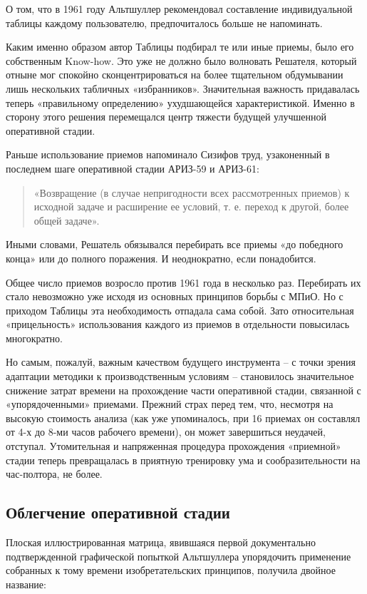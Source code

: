 \documentclass[11pt,a4paper]{article}
\begin{document}
О том, что в 1961 году Альтшуллер рекомендовал составление индивидуальной
таблицы каждому пользователю, предпочиталось больше не напоминать.

Каким именно образом автор Таблицы подбирал те или иные приемы, было его
собственным Know-how. Это уже не должно было волновать Решателя, который
отныне мог спокойно сконцентрироваться на более тщательном обдумывании лишь
нескольких табличных «избранников». Значительная важность придавалась теперь
«правильному определению» ухудшающейся характеристикой. Именно в сторону этого
решения перемещался центр тяжести будущей улучшенной оперативной стадии.

Раньше использование приемов напоминало Сизифов труд, узаконенный в последнем
шаге оперативной стадии АРИЗ-59 и АРИЗ-61:
\begin{quote}
  «Возвращение (в случае непригодности всех рассмотренных приемов) к исходной
  задаче и расширение ее условий, т. е. переход к другой, более общей задаче».
\end{quote}
Иными словами, Решатель обязывался перебирать все приемы «до победного конца»
или до полного поражения. И неоднократно, если понадобится.

Общее число приемов возросло против 1961 года в несколько раз. Перебирать их
стало невозможно уже исходя из основных принципов борьбы с МПиО. Но с приходом
Таблицы эта необходимость отпадала сама собой. Зато относительная
«прицельность» использования каждого из приемов в отдельности повысилась
многократно.

Но самым, пожалуй, важным качеством будущего инструмента -- с точки зрения
адаптации методики к производственным условиям -- становилось значительное
снижение затрат времени на прохождение части оперативной стадии, связанной с
«упорядоченными» приемами. Прежний страх перед тем, что, несмотря на высокую
стоимость анализа (как уже упоминалось, при 16 приемах он составлял от 4-х до
8-ми часов рабочего времени), он может завершиться неудачей, отступал.
Утомительная и напряженная процедура прохождения «приемной» стадии теперь
превращалась в приятную тренировку ума и сообразительности на час-полтора, не
более.

\subsection*{Облегчение оперативной стадии}

Плоская иллюстрированная матрица, явившаяся первой документально
подтвержденной графической попыткой Альтшуллера упорядочить применение
собранных к тому времени изобретательских принципов, получила двойное
название:
\end{document}
